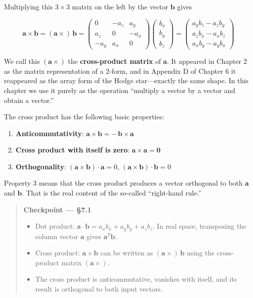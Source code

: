 \documentclass[a4paper,12pt,openany]{book}
\providecommand{\tightlist}{%
  \setlength{\itemsep}{0pt}\setlength{\parskip}{0pt}}
\begin{document}
Multiplying this \(3\times 3\) matrix on the left by the vector
\(\mathbf{b}\) gives

\[\mathbf{a} \times \mathbf{b} = (\mathbf{a} \times)\,\mathbf{b} = \begin{pmatrix}
0 & -a_z & a_y \\
a_z & 0 & -a_x \\
-a_y & a_x & 0
\end{pmatrix}\begin{pmatrix}
b_x \\ b_y \\ b_z
\end{pmatrix} = \begin{pmatrix}
a_y b_z - a_z b_y \\
a_z b_x - a_x b_z \\
a_x b_y - a_y b_x
\end{pmatrix}\]

We call this \((\mathbf{a} \times)\) the \textbf{cross-product matrix}
of \(\mathbf{a}\). It appeared in Chapter 2 as the matrix representation
of a \(2\)-form, and in Appendix D of Chapter 6 it reappeared as the
array form of the Hodge star—exactly the same shape. In this chapter
we use it purely as the operation ``multiply a vector by a vector and
obtain a vector.''

The cross product has the following basic properties:

\begin{enumerate}
\def\labelenumi{\arabic{enumi}.}
\tightlist
\item
  \textbf{Anticommutativity}:
  \(\mathbf{a} \times \mathbf{b} = -\,\mathbf{b} \times \mathbf{a}\)
\item
  \textbf{Cross product with itself is zero}:
  \(\mathbf{a} \times \mathbf{a} = \mathbf{0}\)
\item
  \textbf{Orthogonality}:
  \((\mathbf{a} \times \mathbf{b}) \cdot \mathbf{a} = 0\),
  \((\mathbf{a} \times \mathbf{b}) \cdot \mathbf{b} = 0\)
\end{enumerate}

Property 3 means that the cross product produces a vector orthogonal to
both \(\mathbf{a}\) and \(\mathbf{b}\). That is the real content of the
so-called ``right-hand rule.''

\begin{quote}
\textbf{Checkpoint — §7.1}

\begin{itemize}
\item
  Dot product:
  \(\mathbf{a}\cdot\mathbf{b} = a_x b_x + a_y b_y + a_z b_z\). In real
  space, transposing the column vector \(\mathbf{a}\) gives
  \(\mathbf{a}^T \mathbf{b}\).
\item
  Cross product: \(\mathbf{a}\times\mathbf{b}\) can be written as
  \((\mathbf{a}\times)\,\mathbf{b}\) using the cross-product matrix
  \((\mathbf{a}\times)\).
\item
  The cross product is anticommutative, vanishes with itself, and its
  result is orthogonal to both input vectors.
\end{itemize}
\end{quote}
\end{document}
